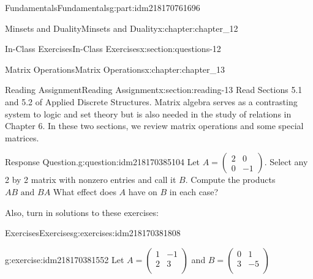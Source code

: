 \documentclass[oneside,10pt,]{book}
\numberwithin{equation}{section}
\begin{document}
\begin{partptx}{Fundamentals}{}{Fundamentals}{}{}{g:part:idm218170761696}
\begin{chapterptx}{Minsets and Duality}{}{Minsets and Duality}{}{}{x:chapter:chapter_12}
\begin{sectionptx}{In-Class Exercises}{}{In-Class Exercises}{}{}{x:section:questions-12}
\end{sectionptx}
\end{chapterptx}
%
\typeout{************************************************}
\typeout{************************************************}
%
\begin{chapterptx}{Matrix Operations}{}{Matrix Operations}{}{}{x:chapter:chapter_13}
%
%
%
\typeout{************************************************}
\typeout{************************************************}
%
\begin{sectionptx}{Reading Assignment}{}{Reading Assignment}{}{}{x:section:reading-13}
Read Sections 5.1 and 5.2 of Applied Discrete Structures. Matrix algebra serves as a contrasting system to logic and set theory but is also needed in the study of relations in Chapter 6.  In these two sections, we review matrix operations and some special matrices.%
\begin{question}{Response Question.}{g:question:idm218170385104}%
Let \(A=\left(\begin{array}{cc} 2 & 0\\ 0 & -1 \end{array}\right)\). Select any 2 by 2 matrix with nonzero entries and call it \(B\). Compute the products \(AB \textrm{ and }BA\)  What effect does \(A\) have on \(B\) in each case?%
\end{question}
Also, turn in solutions to these exercises:%
%
%
\typeout{************************************************}
\typeout{************************************************}
%
\begin{exercises-subsection-numberless}{Exercises}{}{Exercises}{}{}{g:exercises:idm218170381808}
\par\medskip\noindent%
%
\begin{exercisegroup}
\begin{divisionexerciseeg}{1}{}{}{g:exercise:idm218170381552}%
Let \(A=\left(
\begin{array}{cc}
1 & -1 \\
2 & 3 \\
\end{array}
\right)\) and  \(B =\left(
\begin{array}{cc}
0 & 1 \\
3 & -5 \\
\end{array}
\right)\)%
\par
%
\begin{enumerate}[label=(\alph*)]

\end{enumerate}
\end{divisionexerciseeg}
\end{exercisegroup}
\end{exercises-subsection-numberless}
\end{sectionptx}
\end{chapterptx}
\end{partptx}
\end{document}
